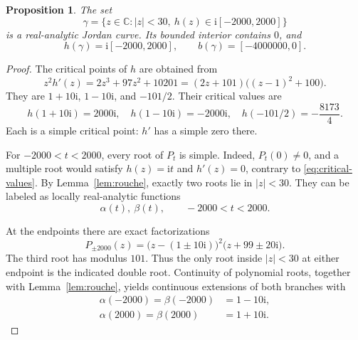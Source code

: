 \documentclass[11pt,a4paper]{amsart}
\newtheorem{proposition}[theorem]{Proposition}
\theoremstyle{remark}
\numberwithin{equation}{section}
\newcommand{\C}{\mathbb C}
\newcommand{\ii}{\mathrm i}
\begin{document}
\begin{proposition}
\label{prop:curve}
The set
\begin{equation}
 \gamma=\{z\in\C:|z|<30,\ h(z)\in\ii[-2000,2000]\}
 \label{eq:gamma}
\end{equation}
is a real-analytic Jordan curve. Its bounded interior contains \(0\), and
\[
 h(\gamma)=\ii[-2000,2000],\qquad
 b(\gamma)=[-4000000,0].
\]
\end{proposition}

\begin{proof}
The critical points of \(h\) are obtained from
\begin{equation}
 z^2h'(z)=2z^3+97z^2+10201
        =(2z+101)\bigl((z-1)^2+100\bigr).
 \label{eq:critical-factor}
\end{equation}
They are \(1+10\ii\), \(1-10\ii\), and \(-101/2\). Their critical values are
\begin{equation}
 h(1+10\ii)=2000\ii,\quad
 h(1-10\ii)=-2000\ii,\quad
 h(-101/2)=-\frac{8173}{4}.
 \label{eq:critical-values}
\end{equation}
Each is a simple critical point: \(h'\) has a simple zero there.

For \(-2000<t<2000\), every root of \(P_t\) is simple. Indeed, \(P_t(0)\neq0\), and a multiple root would satisfy \(h(z)=\ii t\) and \(h'(z)=0\), contrary to \eqref{eq:critical-values}. By Lemma~\ref{lem:rouche}, exactly two roots lie in \(|z|<30\). They can be labeled as locally real-analytic functions
\[
 \alpha(t),\ \beta(t),\qquad -2000<t<2000.
\]



At the endpoints there are exact factorizations
\begin{equation}
 P_{\pm2000}(z)
   =\bigl(z-(1\pm10\ii)\bigr)^2\bigl(z+99\pm20\ii\bigr).
 \label{eq:endpoint-factors}
\end{equation}
The third root has modulus \(101\). Thus the only root inside \(|z|<30\) at either endpoint is the indicated double root. Continuity of polynomial roots, together with Lemma~\ref{lem:rouche}, yields continuous extensions of both branches with
\begin{align*}
 \alpha(-2000)=\beta(-2000)&=1-10\ii,\\
 \alpha(2000)=\beta(2000)&=1+10\ii.
\end{align*}


\end{proof}
\end{document}
